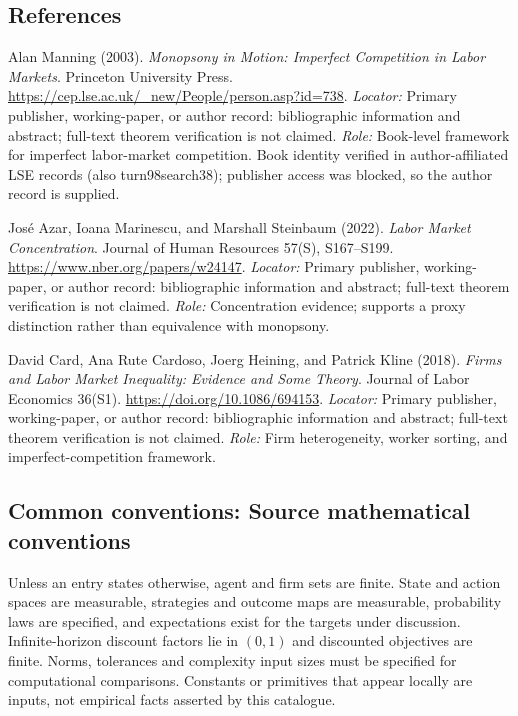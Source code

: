\documentclass[11pt,a4paper]{article}
\begin{document}
\subsection*{References}
\begin{enumerate}[label=\textnormal{[S\arabic*]},leftmargin=*]
\item Alan Manning (2003). \emph{Monopsony in Motion: Imperfect Competition in Labor Markets}. Princeton University Press. \url{https://cep.lse.ac.uk/_new/People/person.asp?id=738}. \textit{Locator:} Primary publisher, working-paper, or author record: bibliographic information and abstract; full-text theorem verification is not claimed. \textit{Role:} Book-level framework for imperfect labor-market competition. Book identity verified in author-affiliated LSE records (also turn98search38); publisher access was blocked, so the author record is supplied.
\item José Azar, Ioana Marinescu, and Marshall Steinbaum (2022). \emph{Labor Market Concentration}. Journal of Human Resources 57(S), S167--S199. \url{https://www.nber.org/papers/w24147}. \textit{Locator:} Primary publisher, working-paper, or author record: bibliographic information and abstract; full-text theorem verification is not claimed. \textit{Role:} Concentration evidence; supports a proxy distinction rather than equivalence with monopsony.
\item David Card, Ana Rute Cardoso, Joerg Heining, and Patrick Kline (2018). \emph{Firms and Labor Market Inequality: Evidence and Some Theory}. Journal of Labor Economics 36(S1). \url{https://doi.org/10.1086/694153}. \textit{Locator:} Primary publisher, working-paper, or author record: bibliographic information and abstract; full-text theorem verification is not claimed. \textit{Role:} Firm heterogeneity, worker sorting, and imperfect-competition framework.
\end{enumerate}

\subsection*{Common conventions: Source mathematical conventions}

Unless an entry states otherwise, agent and firm sets are finite. State and action spaces are measurable, strategies and outcome maps are measurable, probability laws are specified, and expectations exist for the targets under discussion. Infinite-horizon discount factors lie in $(0,1)$ and discounted objectives are finite. Norms, tolerances and complexity input sizes must be specified for computational comparisons. Constants or primitives that appear locally are inputs, not empirical facts asserted by this catalogue.
\end{document}
